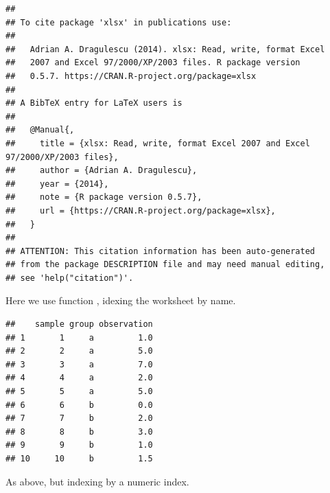 \documentclass[krantz2,ChapterTOCs]{krantz}\usepackage{knitr}
\begin{document}
\begin{knitrout}\footnotesize
{}\color{fgcolor}\begin{kframe}
\begin{alltt}
\hlstd{(} \hlstd{=} \hlstd{)}
\end{alltt}
\begin{verbatim}
## 
## To cite package 'xlsx' in publications use:
## 
##   Adrian A. Dragulescu (2014). xlsx: Read, write, format Excel
##   2007 and Excel 97/2000/XP/2003 files. R package version
##   0.5.7. https://CRAN.R-project.org/package=xlsx
## 
## A BibTeX entry for LaTeX users is
## 
##   @Manual{,
##     title = {xlsx: Read, write, format Excel 2007 and Excel 97/2000/XP/2003 files},
##     author = {Adrian A. Dragulescu},
##     year = {2014},
##     note = {R package version 0.5.7},
##     url = {https://CRAN.R-project.org/package=xlsx},
##   }
## 
## ATTENTION: This citation information has been auto-generated
## from the package DESCRIPTION file and may need manual editing,
## see 'help("citation")'.
\end{verbatim}
\end{kframe}
\end{knitrout}

Here we use function , idexing the worksheet by name.

\begin{knitrout}\footnotesize
{}\color{fgcolor}\begin{kframe}
\begin{alltt}
 \hlkwb{<-} \hlstd{(}\hlstd{,}  \hlstd{=} \hlstd{)}
\end{alltt}
\begin{verbatim}
##    sample group observation
## 1       1     a         1.0
## 2       2     a         5.0
## 3       3     a         7.0
## 4       4     a         2.0
## 5       5     a         5.0
## 6       6     b         0.0
## 7       7     b         2.0
## 8       8     b         3.0
## 9       9     b         1.0
## 10     10     b         1.5
\end{verbatim}
\end{kframe}
\end{knitrout}

As above, but indexing by a numeric index.
\end{document}
